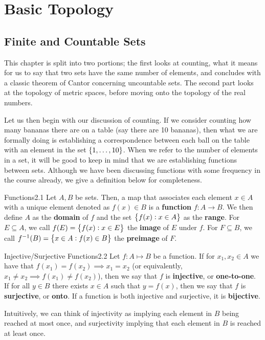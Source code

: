 \newpage
\section{Basic Topology}
\subsection{Finite and Countable Sets}
This chapter is split into two portions; the first looks at counting, what it means for us to say that two sets have the same number of elements, and concludes with a classic theorem of Cantor concerning uncountable sets. The second part looks at the topology of metric spaces, before moving onto the topology of the real numbers. 

Let us then begin with our discussion of counting. If we consider counting how many bananas there are on a table (say there are 10 bananas), then what we are formally doing is establishing a correspondence between each ball on the table with an element in the set $\set{1, \ldots, 10}$. When we refer to the number of elements in a set, it will be good to keep in mind that we are establishing functions between sets. Although we have been discussing functions with some frequency in the course already, we give a definition below for completeness. 

\begin{definition}{Functions}{2.1}
    Let $A, B$ be sets. Then, a map that associates each element $x \in A$ with a unique element denoted as $f(x) \in B$ is a \textbf{function} $f: A \rightarrow B$. We then define $A$ as the \textbf{domain} of $f$ and the set $\set{f(x): x \in A}$ as the \textbf{range}. For $E \subseteq A$, we call $f(E) = \set{f(x): x \in E}$ the \textbf{image} of $E$ under $f$. For $F \subseteq B$, we call $f^{-1}(B) = \set{x \in A: f(x) \in B}$ the \textbf{preimage} of $F$. 
\end{definition}

\begin{definition}{Injective/Surjective Functions}{2.2}
    Let $f: A \mapsto B$ be a function. If for $x_1, x_2 \in A$ we have that $f(x_1) = f(x_2) \implies x_1 = x_2$ (or equivalently, $x_1 \neq x_2 \implies f(x_1) \neq f(x_2)$), then we say that $f$ is \textbf{injective}, or \textbf{one-to-one}. If for all $y \in B$ there exists $x \in A$ such that $y = f(x)$, then we say that $f$ is \textbf{surjective}, or \textbf{onto}. If a function is both injective and surjective, it is \textbf{bijective}.
\end{definition}
\noindent Intuitively, we can think of injectivity as implying each element in $B$ being reached at most once, and surjectivity implying that each element in $B$ is reached at least once. 


